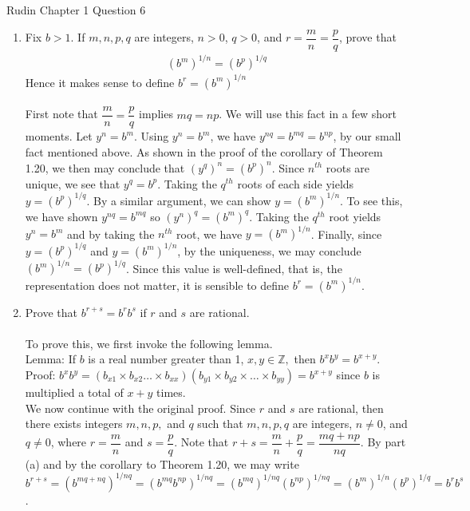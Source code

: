 \documentclass[12pt]{article}
\begin{document}
\problem Rudin Chapter 1 Question 6
\begin{enumerate}
\item Fix $b>1$. If $m, n, p, q$ are integers, $n>0$, $q>0$, and $r=\dfrac{m}{n}=\dfrac{p}{q}$, prove that 
\begin{align*}
(b^{m})^{1/n}=(b^p)^{1/q}
\end{align*}
Hence it makes sense to define $b^{r}=(b^{m})^{1/n}$ \\ \\
First note that $\dfrac{m}{n}=\dfrac{p}{q}$ implies $mq=np$. We will use this fact in a few short moments. Let $y^{n}=b^{m}$. Using $y^{n}=b^{m}$, we have $y^{nq}=b^{mq}=b^{np}$, by our small fact mentioned above. As shown in the proof of the corollary of Theorem 1.20, we then may conclude that $(y^{q})^{n} = (b^{p})^{n}$. Since $n^{th}$ roots are unique, we see that $y^{q}=b^{p}$. Taking the $q^{th}$ roots of each side yields $y=(b^{p})^{1/q}$.  By a similar argument, we can show $y=(b^{m})^{1/n}$. To see this, we have shown $y^{nq}=b^{mq}$ so $(y^{n})^{q}=(b^{m})^{q}$. Taking the $q^{th}$ root yields $y^{n}=b^{m}$ and by taking the $n^{th}$ root, we have $y=(b^{m})^{1/n}$. Finally, since $y=(b^{p})^{1/q}$ and $y=(b^{m})^{1/n}$, by the uniqueness, we may conclude $(b^{m})^{1/n}=(b^p)^{1/q}$. Since this value is well-defined, that is, the representation does not matter, it is sensible to define   $b^{r}=(b^{m})^{1/n}$.  \\
\item  Prove that $b^{r+s} = b^{r}b^{s}$ if $r$ and $s$ are rational. \\ \\
To prove this, we first invoke the following lemma. \\
Lemma: If $b$ is a real number greater than 1, $x,y \in \mathbb{Z},$ then $b^{x}b^{y} = b^{x+y}.$ \\
Proof: $b^{x}b^{y} = (b_{x1} \times b_{x2} \ldots \times  b_{xx})(b_{y1} \times  b_{y2} \times  \ldots \times  b_{yy}) = b^{x+y}$ since $b$ is multiplied a total of $x+y$ times. \\ 

We now continue with the original proof. Since $r$ and $s$ are rational, then there exists integers $m,n,p,$ and $q$ such that $m,n,p,q$ are integers, $n \neq 0$, and $q \neq 0$, where $r=\dfrac{m}{n}$ and $s=\dfrac{p}{q}$. Note that $r+s=  \dfrac{m}{n} + \dfrac{p}{q} = \dfrac{mq+np}{nq}$. By part (a) and by the corollary to Theorem 1.20, we may write $b^{r+s}=(b^{mq+nq})^{1/nq} = (b^{mq}b^{np})^{1/nq} = (b^{mq})^{1/nq}(b^{np})^{1/nq} = (b^{m})^{1/n}(b^{p})^{1/q}=b^{r}b^{s}$. \\  \\ 


\end{enumerate}
\end{document}
